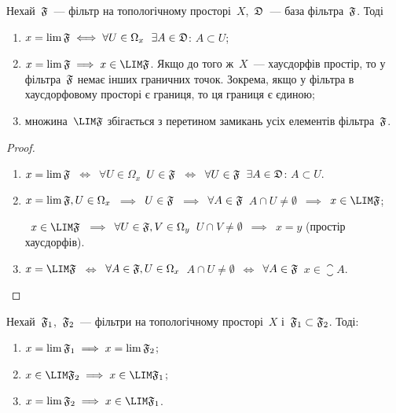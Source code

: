 \begin{theorem}
    \label{th:filterbase-limits-limitpoitns}
    Нехай~$\frak F$~--- фільтр на топологічному просторі~$X$,~$\frak D$~--- %
    база фільтра~$\frak F$. Тоді
    \begin{enumerate}
        \item $x = \lim \frak F \iff \forall U \in \Omega_x$~$\exists A \in \frak D$: $A \subset U$;
        
        \item $x = \lim \frak F \implies x \in \LIM \frak F$. Якщо до того ж~$X$~--- хаусдорфів простір, то у фільтра~$\frak F$ немає інших граничних точок. Зокрема, якщо у фільтра в хаусдорфовому просторі є границя, то ця границя є єдиною;
        
        \item множина~$\LIM \frak F$ збігається з перетином замикань усіх елементів фільтра~$\frak F$.
    \end{enumerate}
\end{theorem}

\begin{proof}
    \listhack
    \begin{enumerate}
        \item $x = \lim \frak F$~$\iff$~$\forall U \in \Omega_x$~$U \in \frak F$~$\iff$~$\forall U \in \frak F$~$\exists A \in \frak D$: $A \subset U$.

        \item $x = \lim \frak F, U \in \Omega_x$~$\implies$~$U \in \frak F$~$\implies$~$\forall A \in \frak F$~$A \cap U \ne \emptyset$~$\implies$~$x \in \LIM \frak F$;
        
       ~$x \in \LIM \frak F$~$\implies$~$\forall U \in \frak F, V \in \Omega_y$~$U \cap V \ne \emptyset$~$\implies$~$x = y$ (простір хаусдорфів).

        \item $x = \LIM \frak F$~$\iff$~$\forall A \in \frak F, U \in \Omega_x$~$A \cap U \ne \emptyset$~$\iff$~$\forall A \in \frak F$~$x \in \closure A$. \qedhere
    \end{enumerate}
\end{proof}

\begin{theorem}
    \label{th:filters-limits-limitpoitns}
    Нехай~$\frak F_1$,~$\frak F_2$~--- фільтри на топологічному просторі~$X$ і~$\frak F_1 \subset \frak F_2$. Тоді:
    \begin{enumerate}
        \item $x = \lim \frak F_1 \implies x = \lim \frak F_2$;
        \item $x \in \LIM \frak F_2 \implies x \in \LIM \frak F_1$;
        \item $x = \lim \frak F_2 \implies x \in \LIM \frak F_1$.
    \end{enumerate}
\end{theorem}

